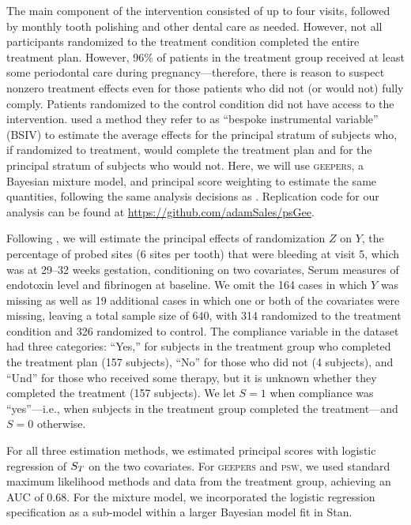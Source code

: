 \documentclass[]{article}
\begin{document}
The main component of the intervention consisted of up to four visits, followed by monthly tooth polishing and other dental care as needed. However, not all participants randomized to the treatment condition completed the entire treatment plan.
However, 96\% of patients in the treatment group received at least some periodontal care during pregnancy---therefore, there is reason to suspect nonzero treatment effects even for those patients who did not (or would not) fully comply.
Patients randomized to the control condition did not have access to the intervention.
\citet{richardson2023estimating} used a method they refer to as ``bespoke instrumental variable'' (BSIV) to estimate the average effects for the principal stratum of subjects who, if randomized to treatment,  would complete the treatment plan and for the principal stratum of subjects who would not.
Here, we will use \textsc{geepers}, a Bayesian mixture model, and principal score weighting to estimate the same quantities, following the same analysis decisions as \citet{richardson2023estimating}.
Replication code for our analysis can be found at \url{ https://github.com/adamSales/psGee}.

Following \citep{richardson2023estimating}, we will estimate the principal effects of randomization $Z$ on $Y$, the percentage of probed sites (6 sites per tooth) that were bleeding at visit 5, which was at 29--32 weeks gestation, conditioning on two covariates, Serum measures of endotoxin level and fibrinogen at baseline.
We omit the 164 cases in which $Y$ was missing as well as 19 additional cases in which one or both of the covariates were missing, leaving a total sample size of 640, with 314 randomized to the treatment condition and 326 randomized to control.
The compliance variable in the dataset had three categories: ``Yes,'' for subjects in the treatment group who completed the treatment plan (157 subjects), ``No'' for those who did not (4 subjects), and ``Und'' for those who received some therapy, but it is unknown whether they completed the treatment (157 subjects).
We let $S=1$ when compliance was ``yes''---i.e., when subjects in the treatment group completed the treatment---and $S=0$ otherwise.

For all three estimation methods, we estimated principal scores with logistic regression of $S_T$ on the two covariates.
For \textsc{geepers} and \textsc{psw}, we used standard maximum likelihood methods and data from the treatment group, achieving an AUC of 0.68. For the mixture model, we incorporated the logistic regression specification as a sub-model within a larger Bayesian model fit in Stan.
\end{document}
